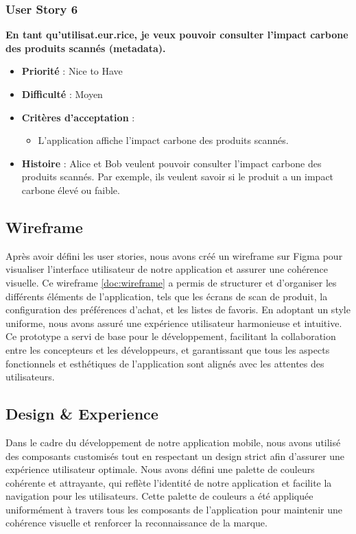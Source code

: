 \subsubsection{User Story 6}

\textbf{En tant qu'utilisat.eur.rice, je veux pouvoir consulter l'impact carbone des produits scannés (metadata).}

\begin{itemize}[noitemsep]
    \item \textbf{Priorité} : Nice to Have
    \item \textbf{Difficulté} : Moyen
    \item \textbf{Critères d'acceptation} :
          \begin{itemize}[noitemsep]
              \item L'application affiche l'impact carbone des produits scannés.
          \end{itemize}
    \item \textbf{Histoire} : Alice et Bob veulent pouvoir consulter l'impact carbone des produits scannés. Par exemple, ils veulent savoir si le produit a un impact carbone élevé ou faible.
\end{itemize}

\subsection{Wireframe}

Après avoir défini les user stories, nous avons créé un wireframe sur Figma pour visualiser l'interface utilisateur de notre application et assurer une cohérence visuelle. Ce wireframe \ref{doc:wireframe} a permis de structurer et d'organiser les différents éléments de l'application, tels que les écrans de scan de produit, la configuration des préférences d'achat, et les listes de favoris. En adoptant un style uniforme, nous avons assuré une expérience utilisateur harmonieuse et intuitive. Ce prototype a servi de base pour le développement, facilitant la collaboration entre les concepteurs et les développeurs, et garantissant que tous les aspects fonctionnels et esthétiques de l'application sont alignés avec les attentes des utilisateurs.

\subsection{Design \& Experience}

Dans le cadre du développement de notre application mobile, nous avons utilisé des composants customisés tout en respectant un design strict afin d'assurer une expérience utilisateur optimale. Nous avons défini une palette de couleurs cohérente et attrayante, qui reflète l'identité de notre application et facilite la navigation pour les utilisateurs. Cette palette de couleurs a été appliquée uniformément à travers tous les composants de l'application pour maintenir une cohérence visuelle et renforcer la reconnaissance de la marque.

